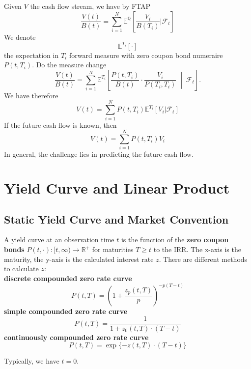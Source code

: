 \begin{definition}
Given $V$ the cash flow stream, we have by FTAP
	\begin{equation*}
		\frac{V(t)}{B(t)} = \sum_{i = 1}^N \mathbb{E}^{\mathbb{Q}}\left[\frac{V_i}{B(T_i)}|\mathcal{F}_t\right] 
	\end{equation*}
	We denote 
	\[
	\mathbb{E}^{T_i}[ \cdot ]
	\]
	the expectation in $T_i$ forward measure with zero coupon bond numeraire $P(t, T_i)$. Do the measure change
	\[
\frac{V(t)}{B(t)} = \sum_{i=1}^{N} \mathbb{E}^{T_i} \left[ \frac{P(t, T_i)}{B(t)} \cdot \frac{V_i}{P(T_i, T_i)} \;\middle|\; \mathcal{F}_t \right].
\]
We have therefore
	\begin{equation*}
		V(t) = \sum^N_{i = 1}P(t, T_i) \mathbb{E}^{T_i}[V_i|\mathcal{F}_t]
	\end{equation*}
	If the future cash flow is known, then
	\begin{equation*}
		V(t) = \sum^N_{i = 1}P(t, T_i) V_i
	\end{equation*}
	In general, the challenge lies in predicting the future cash flow.
\end{definition}



\section{Yield Curve and Linear Product}
\subsection{Static Yield Curve and Market Convention}

\begin{definition}	
A yield curve at an observation time $t$ is the function of the \textbf{zero coupon bonds} $P(t, \cdot): [t, \infty) \rightarrow \mathbb{R}^+$ for maturities $T \geq t$ to the IRR. The x-axis is the maturity, the y-axis is the calculated interest rate $z$. There are different methods to calculate $z$:  \\
\textbf{discrete compounded zero rate curve}
\begin{equation*}
	P(t, T) = ( 1 + \frac{z_p(t, T)}{p})^{-p(T-t)}
\end{equation*}
\textbf{simple compounded zero rate curve}
\begin{equation*}
	P(t, T) = \frac{1}{1 + z_0(t, T)\cdot(T - t)}
\end{equation*}
\textbf{continuously compounded zero rate curve}
\begin{equation*}
	P(t, T) = \exp\{ - z(t, T) \cdot (T - t) \}
\end{equation*}
\end{definition}
\begin{remark}
Typically, we have $t = 0$. 	
\end{remark}


